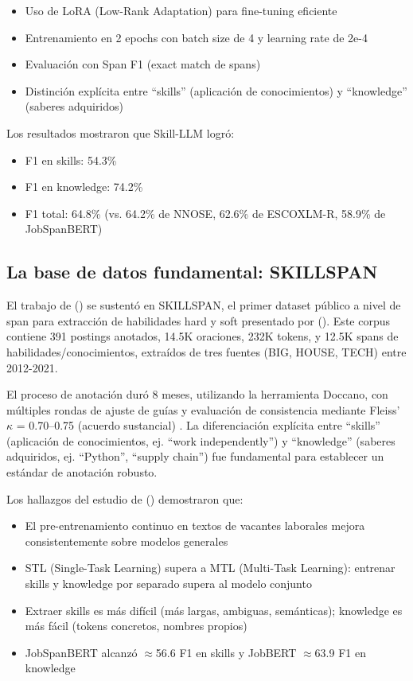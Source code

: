 \begin{itemize}
    \item Uso de LoRA (Low-Rank Adaptation) para fine-tuning eficiente
    \item Entrenamiento en 2 epochs con batch size de 4 y learning rate de 2e-4
    \item Evaluación con Span F1 (exact match de spans)
    \item Distinción explícita entre ``skills'' (aplicación de conocimientos) y ``knowledge'' (saberes adquiridos)
\end{itemize}

Los resultados mostraron que Skill-LLM logró:

\begin{itemize}
    \item F1 en skills: 54.3\%
    \item F1 en knowledge: 74.2\%
    \item F1 total: 64.8\% (vs. 64.2\% de NNOSE, 62.6\% de ESCOXLM-R, 58.9\% de JobSpanBERT) \cite{herandi2024}
\end{itemize}

\subsection{La base de datos fundamental: SKILLSPAN}

El trabajo de \citeauthor{herandi2024} (\citeyear{herandi2024}) se sustentó en SKILLSPAN, el primer dataset público a nivel de span para extracción de habilidades hard y soft presentado por \citeauthor{zhang2022} (\citeyear{zhang2022}). Este corpus contiene 391 postings anotados, 14.5K oraciones, 232K tokens, y 12.5K spans de habilidades/conocimientos, extraídos de tres fuentes (BIG, HOUSE, TECH) entre 2012-2021.

El proceso de anotación duró 8 meses, utilizando la herramienta Doccano, con múltiples rondas de ajuste de guías y evaluación de consistencia mediante Fleiss' $\kappa$ = 0.70–0.75 (acuerdo sustancial) \cite{zhang2022}. La diferenciación explícita entre ``skills'' (aplicación de conocimientos, ej. ``work independently'') y ``knowledge'' (saberes adquiridos, ej. ``Python'', ``supply chain'') fue fundamental para establecer un estándar de anotación robusto.

Los hallazgos del estudio de \citeauthor{zhang2022} (\citeyear{zhang2022}) demostraron que:

\begin{itemize}
    \item El pre-entrenamiento continuo en textos de vacantes laborales mejora consistentemente sobre modelos generales
    \item STL (Single-Task Learning) supera a MTL (Multi-Task Learning): entrenar skills y knowledge por separado supera al modelo conjunto
    \item Extraer skills es más difícil (más largas, ambiguas, semánticas); knowledge es más fácil (tokens concretos, nombres propios)
    \item JobSpanBERT alcanzó $\approx$56.6 F1 en skills y JobBERT $\approx$63.9 F1 en knowledge \cite{zhang2022}
\end{itemize}

